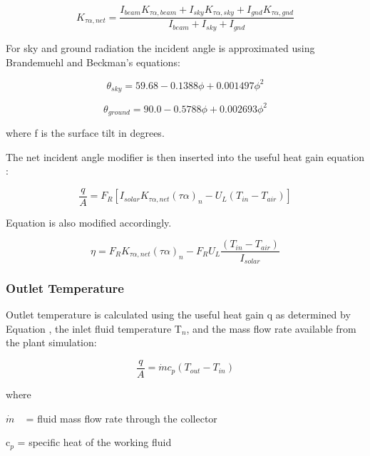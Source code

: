 \begin{equation}
{K_{\tau \alpha ,net}} = \frac{{{I_{beam}}{K_{\tau \alpha ,beam}} + {I_{sky}}{K_{\tau \alpha ,sky}} + {I_{gnd}}{K_{\tau \alpha ,gnd}}}}{{{I_{beam}} + {I_{sky}} + {I_{gnd}}}}
\end{equation}

For sky and ground radiation the incident angle is approximated using Brandemuehl and Beckman's equations:

\begin{equation}
{\theta_{sky}} = 59.68 - 0.1388\phi  + 0.001497{\phi ^2}
\end{equation}

\begin{equation}
{\theta_{ground}} = 90.0 - 0.5788\phi  + 0.002693{\phi ^2}
\end{equation}

where f is the surface tilt in degrees.

The net incident angle modifier is then inserted into the useful heat gain equation :

\begin{equation}
\frac{q}{A} = {F_R}\left[ {{I_{solar}}{K_{\tau \alpha ,net}}{{(\tau \alpha )}_n} - {U_L}({T_{in}} - {T_{air}})} \right]
\end{equation}

Equation is also modified accordingly.

\begin{equation}
\eta  = {F_R}{K_{\tau \alpha ,net}}{(\tau \alpha )_n} - {F_R}{U_L}\frac{{({T_{in}} - {T_{air}})}}{{{I_{solar}}}}
\end{equation}

\subsubsection{Outlet Temperature}\label{outlet-temperature}

Outlet temperature is calculated using the useful heat gain q as determined by Equation , the inlet fluid temperature T\(_{n}\), and the mass flow rate available from the plant simulation:

\begin{equation}
\frac{q}{A} = \dot m{c_p}({T_{out}} - {T_{in}})
\end{equation}

where

\(\dot m\) ~ = fluid mass flow rate through the collector

c\(_{p}\) = specific heat of the working fluid


